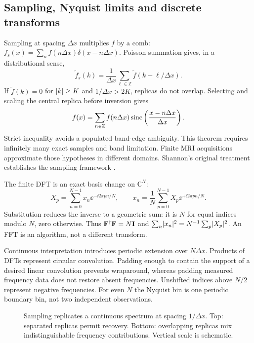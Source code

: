 \subsection{Sampling, Nyquist limits and discrete transforms}
Sampling at spacing $\Delta x$ multiplies $f$ by a comb:
$f_s(x)=\sum_n f(n\Delta x)\delta(x-n\Delta x)$.
Poisson summation gives, in a distributional sense,
\begin{equation}
 \widetilde f_s(k)=\frac{1}{\Delta x}
       \sum_{\ell\in\mathbb Z}\widetilde f(k-\ell/\Delta x).
 \label{eq:01:replicas}
\end{equation}
If $\widetilde f(k)=0$ for $\lvert k\rvert\geq K$ and $1/\Delta x>2K$,
replicas do not overlap. Selecting and scaling the central replica
before inversion gives
\begin{equation}
 f(x)=\sum_{n\in\mathbb Z} f(n\Delta x)
       \operatorname{sinc}\left(\frac{x-n\Delta x}{\Delta x}\right).
 \label{eq:01:shannon}
\end{equation}
Strict inequality avoids a populated band-edge ambiguity.
This theorem requires infinitely many exact samples and band limitation.
Finite MRI acquisitions approximate those hypotheses in different domains.
Shannon's original treatment establishes the sampling framework
\cite{shannon1949}.

The finite DFT is an exact basis change on $\mathbb C^N$:
\begin{equation}
 X_p=\sum_{n=0}^{N-1}x_n\ee^{-\ii2\pi pn/N},\qquad
 x_n=\frac1N\sum_{p=0}^{N-1}X_p\ee^{+\ii2\pi pn/N}.
 \label{eq:01:dft}
\end{equation}
Substitution reduces the inverse to a geometric sum: it is $N$ for
equal indices modulo $N$, zero otherwise.
Thus $\mathbf{F}^{\dagger}\mathbf{F}=N\mathbf{I}$ and
$\sum_n\lvert x_n\rvert^2=N^{-1}\sum_p\lvert X_p\rvert^2$.
An FFT is an algorithm, not a different transform.

Continuous interpretation introduces periodic extension over $N\Delta x$.
Products of DFTs represent circular convolution. Padding enough to contain
the support of a desired linear convolution prevents wraparound, whereas
padding measured frequency data does not restore absent frequencies.
Unshifted indices above $N/2$ represent negative frequencies.
For even $N$ the Nyquist bin is one periodic boundary bin, not two
independent observations.

\begin{figure}[tb]
 \centering
 \caption{Sampling replicates a continuous spectrum at spacing $1/\Delta x$.
 Top: separated replicas permit recovery. Bottom: overlapping replicas
 mix indistinguishable frequency contributions. Vertical scale is schematic.}
 \label{fig:01:sampling}
\end{figure}

